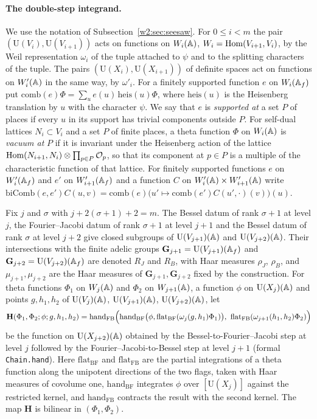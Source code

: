 \paragraph{The double-step integrand.} We use the notation of Subsection~\ref{w2:sec:seesaw}. For $0\le i<m$ the pair $(\mathrm U(V_i),\mathrm U(V_{i+1}))$ acts on functions on $W_i(\mathbb A)$, $W_i=\operatorname{Hom}(V_{i+1},V_i)$, by the Weil representation $\omega_i$ of the tuple attached to $\psi$ and to the splitting characters of the tuple. The pairs $(\mathrm U(X_i),\mathrm U(X_{i+1}))$ of definite spaces act on functions on $W'_i(\mathbb A)$ in the same way, by $\omega'_i$. For a finitely supported function $e$ on $W_i(\mathbb A_f)$ put $\mathrm{comb}(e)\Phi=\sum_ue(u)\,\mathrm{heis}(u)\Phi$, where $\mathrm{heis}(u)$ is the Heisenberg translation by $u$ with the character $\psi$. We say that $e$ is \emph{supported at} a set $P$ of places if every $u$ in its support has trivial components outside $P$. For self-dual lattices $N_i\subset V_i$ and a set $P$ of finite places, a theta function $\Phi$ on $W_i(\mathbb A)$ is \emph{vacuum at} $P$ if it is invariant under the Heisenberg action of the lattice $\operatorname{Hom}(N_{i+1},N_i)\otimes\prod_{p\in P}\mathcal O_p$, so that its component at $p\in P$ is a multiple of the characteristic function of that lattice. For finitely supported functions $e$ on $W'_i(\mathbb A_f)$ and $e'$ on $W'_{i+1}(\mathbb A_f)$ and a function $C$ on $W'_i(\mathbb A)\times W'_{i+1}(\mathbb A)$ write $\mathrm{biComb}(e,e')C(u,v)=\mathrm{comb}(e)\bigl(u'\mapsto\mathrm{comb}(e')C(u',\cdot)(v)\bigr)(u)$.

Fix $j$ and $\sigma$ with $j+2(\sigma+1)+2=m$. The Bessel datum of rank $\sigma+1$ at level $j$, the Fourier--Jacobi datum of rank $\sigma+1$ at level $j+1$ and the Bessel datum of rank $\sigma$ at level $j+2$ give closed subgroups of $\mathrm U(V_{j+1})(\mathbb A)$ and $\mathrm U(V_{j+2})(\mathbb A)$. Their intersections with the finite adelic groups $\mathbf G_{j+1}=\mathrm U(V_{j+1})(\mathbb A_f)$ and $\mathbf G_{j+2}=\mathrm U(V_{j+2})(\mathbb A_f)$ are denoted $R_J$ and $R_B$, with Haar measures $\rho_J$, $\rho_B$, and $\mu_{j+1},\mu_{j+2}$ are the Haar measures of $\mathbf G_{j+1},\mathbf G_{j+2}$ fixed by the construction. For theta functions $\Phi_1$ on $W_j(\mathbb A)$ and $\Phi_2$ on $W_{j+1}(\mathbb A)$, a function $\phi$ on $\mathrm U(X_j)(\mathbb A)$ and points $g,h_1,h_2$ of $\mathrm U(V_j)(\mathbb A)$, $\mathrm U(V_{j+1})(\mathbb A)$, $\mathrm U(V_{j+2})(\mathbb A)$, let
\[
\mathbf H(\Phi_1,\Phi_2;\phi;g,h_1,h_2)=\mathrm{hand}_{\mathrm{FB}}\Bigl(\mathrm{hand}_{\mathrm{BF}}\bigl(\phi,\mathrm{flat}_{\mathrm{BF}}(\omega_j(g,h_1)\Phi_1)\bigr),\ \mathrm{flat}_{\mathrm{FB}}(\omega_{j+1}(h_1,h_2)\Phi_2)\Bigr)
\]
be the function on $\mathrm U(X_{j+2})(\mathbb A)$ obtained by the Bessel-to-Fourier--Jacobi step at level $j$ followed by the Fourier--Jacobi-to-Bessel step at level $j+1$ (formal \texttt{Chain.hand}). Here $\mathrm{flat}_{\mathrm{BF}}$ and $\mathrm{flat}_{\mathrm{FB}}$ are the partial integrations of a theta function along the unipotent directions of the two flags, taken with Haar measures of covolume one, $\mathrm{hand}_{\mathrm{BF}}$ integrates $\phi$ over $[\mathrm U(X_j)]$ against the restricted kernel, and $\mathrm{hand}_{\mathrm{FB}}$ contracts the result with the second kernel. The map $\mathbf H$ is bilinear in $(\Phi_1,\Phi_2)$.

